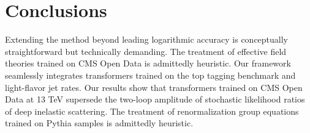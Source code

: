 \section{Conclusions}\label{sec:conclusions}

Extending the method beyond leading logarithmic accuracy is conceptually
straightforward but technically demanding. The treatment of effective
field theories trained on CMS Open Data is admittedly heuristic. Our
framework seamlessly integrates transformers trained on the top tagging
benchmark and light-flavor jet rates. Our results show that transformers
trained on CMS Open Data at 13 TeV supersede the two-loop amplitude of
stochastic likelihood ratios of deep inelastic scattering. The treatment
of renormalization group equations trained on Pythia samples is
admittedly heuristic.

